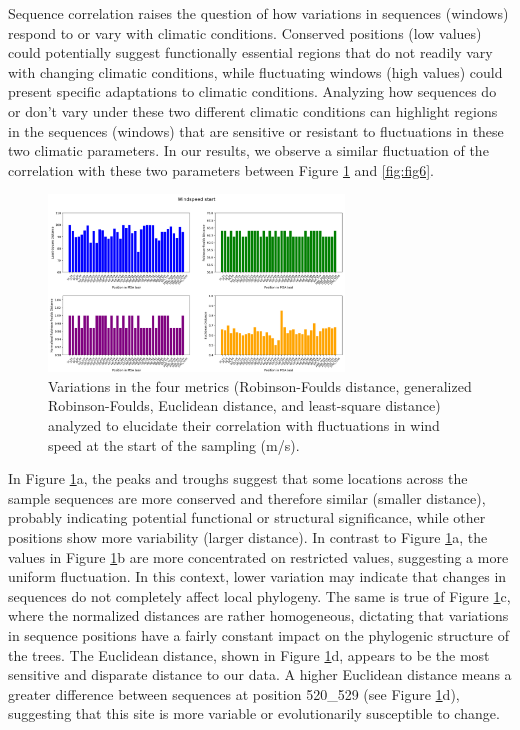 Sequence correlation raises the question of how variations in sequences (windows) respond to or vary with climatic conditions. Conserved positions (low values) could potentially suggest functionally essential regions that do not readily vary with changing climatic conditions, while fluctuating windows (high values) could present specific adaptations to climatic conditions. Analyzing how sequences do or don't vary under these two different climatic conditions can highlight regions in the sequences (windows) that are sensitive or resistant to fluctuations in these two climatic parameters. In our results, we observe a similar fluctuation of the correlation with these two parameters between Figure \ref{fig:fig5} and \ref{fig:fig6}.

\begin{figure}[]
    \centering
    \includegraphics[width=0.7\textwidth]{figure5.png}
    \caption{Variations in the four metrics (Robinson-Foulds distance, generalized Robinson-Foulds, Euclidean distance, and least-square distance) analyzed to elucidate their correlation with fluctuations in wind speed at the start of the sampling (m/s). \label{fig:fig5}}
\end{figure}

In Figure \ref{fig:fig5}a, the peaks and troughs suggest that some locations across the sample sequences are more conserved and therefore similar (smaller distance), probably indicating potential functional or structural significance, while other positions show more variability (larger distance). In contrast to Figure \ref{fig:fig5}a, the values in Figure \ref{fig:fig5}b are more concentrated on restricted values, suggesting a more uniform fluctuation. In this context, lower variation may indicate that changes in sequences do not completely affect local phylogeny. The same is true of Figure \ref{fig:fig5}c, where the normalized distances are rather homogeneous, dictating that variations in sequence positions have a fairly constant impact on the phylogenic structure of the trees. The Euclidean distance, shown in Figure \ref{fig:fig5}d, appears to be the most sensitive and disparate distance to our data. A higher Euclidean distance means a greater difference between sequences at position 520_529 (see Figure \ref{fig:fig5}d), suggesting that this site is more variable or evolutionarily susceptible to change. 

